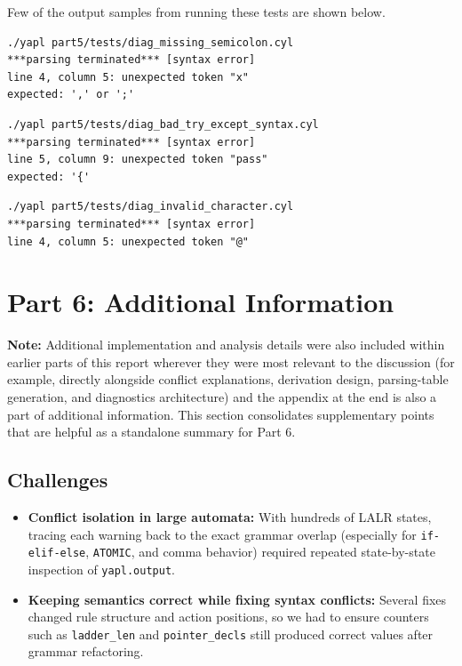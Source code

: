 \documentclass[a4paper,12pt]{article}
\begin{document}
Few of the output samples from running these tests are shown below.
\begin{lstlisting}
./yapl part5/tests/diag_missing_semicolon.cyl
***parsing terminated*** [syntax error]
line 4, column 5: unexpected token "x"
expected: ',' or ';'
\end{lstlisting}

\begin{lstlisting}
./yapl part5/tests/diag_bad_try_except_syntax.cyl
***parsing terminated*** [syntax error]
line 5, column 9: unexpected token "pass"
expected: '{'
\end{lstlisting}

\begin{lstlisting}
./yapl part5/tests/diag_invalid_character.cyl
***parsing terminated*** [syntax error]
line 4, column 5: unexpected token "@"
\end{lstlisting}


\newpage
\section{Part 6: Additional Information}

\textbf{Note:} Additional implementation and analysis details were also included within earlier parts of this report wherever they were most relevant to the discussion (for example, directly alongside conflict explanations, derivation design, parsing-table generation, and diagnostics architecture) and the appendix at the end is also a part of additional information. This section consolidates supplementary points that are helpful as a standalone summary for Part 6.

\subsection{Challenges}

\begin{itemize}
    \item \textbf{Conflict isolation in large automata:} With hundreds of LALR states, tracing each warning back to the exact grammar overlap (especially for \texttt{if-elif-else}, \texttt{ATOMIC}, and comma behavior) required repeated state-by-state inspection of \texttt{yapl.output}.
    \item \textbf{Keeping semantics correct while fixing syntax conflicts:} Several fixes changed rule structure and action positions, so we had to ensure counters such as \texttt{ladder\_len} and \texttt{pointer\_decls} still produced correct values after grammar refactoring.
\end{itemize}
\end{document}
